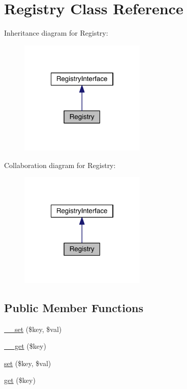 \hypertarget{classapp_1_1models_1_1core_1_1_registry}{\section{Registry Class Reference}
\label{classapp_1_1models_1_1core_1_1_registry}
}


Inheritance diagram for Registry\-:
\nopagebreak
\begin{figure}[H]
\begin{center}
\leavevmode
\includegraphics[width=170pt]{classapp_1_1models_1_1core_1_1_registry__inherit__graph}
\end{center}
\end{figure}


Collaboration diagram for Registry\-:
\nopagebreak
\begin{figure}[H]
\begin{center}
\leavevmode
\includegraphics[width=170pt]{classapp_1_1models_1_1core_1_1_registry__coll__graph}
\end{center}
\end{figure}
\subsection*{Public Member Functions}
\begin{DoxyCompactItemize}
\item 
\hyperlink{classapp_1_1models_1_1core_1_1_registry_ae5e0d9ea041c1957ef04189b0b29657c}{\-\_\-\-\_\-set} (\$key, \$val)
\item 
\hyperlink{classapp_1_1models_1_1core_1_1_registry_a4537dad3b44254124991341cc91b28fb}{\-\_\-\-\_\-get} (\$key)
\item 
\hyperlink{classapp_1_1models_1_1core_1_1_registry_ac8d8012023e560c81f55a629022cb65a}{set} (\$key, \$val)
\item 
\hyperlink{classapp_1_1models_1_1core_1_1_registry_a24a9bf83a1002d46ece83a93d14bd921}{get} (\$key)
\end{DoxyCompactItemize}


